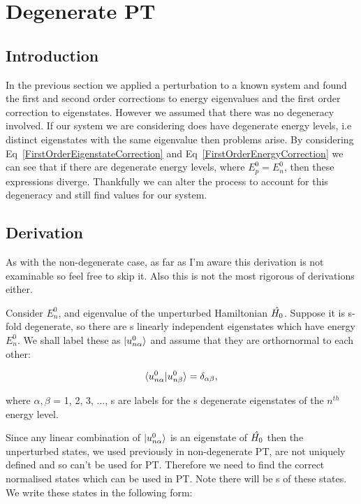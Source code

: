 \chapter{Degenerate PT}
\label{chapt2} 

\section{Introduction}

In the previous section we applied a perturbation to a known system and found the first and second order corrections to energy eigenvalues and the first order correction to eigenstates. However we assumed that there was no degeneracy involved. If our system we are considering does have degenerate energy levels, i.e distinct eigenstates with the same eigenvalue then problems arise. By considering Eq~\ref{FirstOrderEigenstateCorrection} and Eq~\ref{FirstOrderEnergyCorrection} we can see that if there are degenerate energy levels, where $E^0_p = E^0_n$, then these expressions diverge. Thankfully we can alter the process to account for this degeneracy and still find values for our system.

\section{Derivation}

As with the non-degenerate case, as far as I'm aware this derivation is not examinable so feel free to skip it. Also this is not the most rigorous of derivations either.

\noindent Consider $E^0_n$, and eigenvalue of the unperturbed Hamiltonian $\Hat{H_0}$. Suppose it is s-fold degenerate, so there are s linearly independent eigenstates which have energy $E^0_n$. We shall label these as $\ket{u^0_{n \alpha}}$ and assume that they are orthornormal to each other:

\begin{equation}
        \braket{u^0_{n \alpha} | u^0_{n \beta}} = \delta_{\alpha \beta},
    \label{DegenerateEigenfunctions}
\end{equation}

\noindent where $\alpha, \beta$ = 1, 2, 3, ..., s are labels for the s degenerate eigenstates of the $n^{th}$ energy level.

\noindent Since any linear combination of $\ket{u^0_{n \alpha}}$ is an eigenstate of $\Hat{H_0}$ then the unperturbed states, we used previously in non-degenerate PT, are not uniquely defined and so can't be used for PT. Therefore we need to find the correct normalised states which can be used in PT. Note there will be s of these states. We write these states in the following form:

